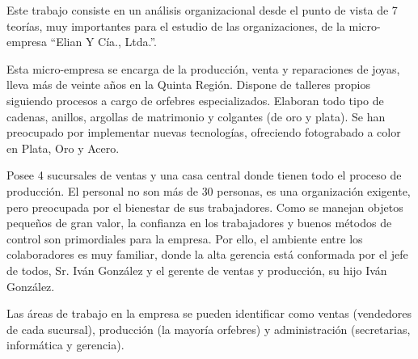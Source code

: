 

Este trabajo consiste en un análisis organizacional desde el punto de vista de 7 teorías, muy importantes
para el estudio de las organizaciones, de la micro-empresa ``Elian Y Cía., Ltda.''.

Esta micro-empresa se encarga de la producción, venta y reparaciones de joyas, lleva más de veinte años en
la Quinta Región. Dispone de talleres propios siguiendo procesos a cargo de orfebres especializados.
Elaboran todo tipo de cadenas, anillos, argollas de matrimonio y colgantes (de oro y plata).
Se han preocupado por implementar nuevas tecnologías, ofreciendo fotograbado a color en Plata, Oro y
Acero.

Posee 4 sucursales de ventas y una casa central donde tienen todo el proceso de producción. El personal
no son más de 30 personas, es una organización exigente, pero preocupada por el bienestar de sus
trabajadores. Como se manejan objetos pequeños de gran valor, la confianza en los trabajadores y buenos
métodos de control son primordiales para la empresa. Por ello, el ambiente entre los colaboradores es muy
familiar, donde la alta gerencia está conformada por el jefe de todos, Sr. Iván González y el gerente de
ventas y producción, su hijo Iván González.

Las áreas de trabajo en la empresa se pueden identificar como
ventas (vendedores de cada sucursal), producción (la mayoría orfebres) y administración (secretarias, 
informática y gerencia).
